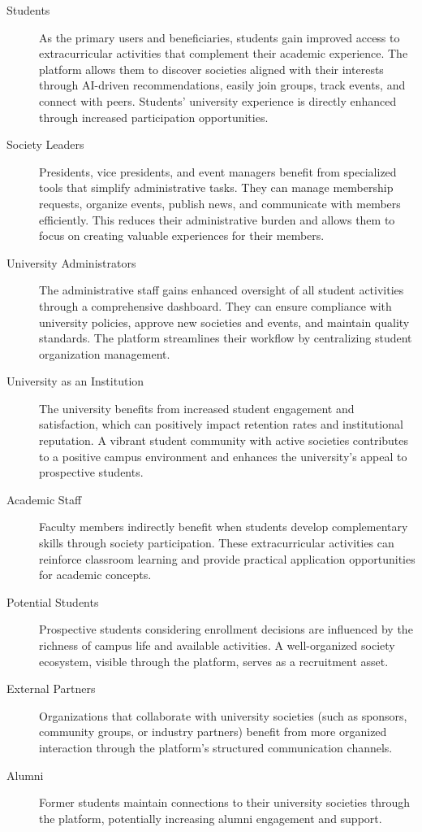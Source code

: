 \begin{description}
    \item[Students] As the primary users and beneficiaries, students gain improved access to extracurricular activities that complement their academic experience. The platform allows them to discover societies aligned with their interests through AI-driven recommendations, easily join groups, track events, and connect with peers. Students' university experience is directly enhanced through increased participation opportunities.
    
    \item[Society Leaders] Presidents, vice presidents, and event managers benefit from specialized tools that simplify administrative tasks. They can manage membership requests, organize events, publish news, and communicate with members efficiently. This reduces their administrative burden and allows them to focus on creating valuable experiences for their members.
    
    \item[University Administrators] The administrative staff gains enhanced oversight of all student activities through a comprehensive dashboard. They can ensure compliance with university policies, approve new societies and events, and maintain quality standards. The platform streamlines their workflow by centralizing student organization management.
    
    \item[University as an Institution] The university benefits from increased student engagement and satisfaction, which can positively impact retention rates and institutional reputation. A vibrant student community with active societies contributes to a positive campus environment and enhances the university's appeal to prospective students.
    
    \item[Academic Staff] Faculty members indirectly benefit when students develop complementary skills through society participation. These extracurricular activities can reinforce classroom learning and provide practical application opportunities for academic concepts.
    
    \item[Potential Students] Prospective students considering enrollment decisions are influenced by the richness of campus life and available activities. A well-organized society ecosystem, visible through the platform, serves as a recruitment asset.
    
    \item[External Partners] Organizations that collaborate with university societies (such as sponsors, community groups, or industry partners) benefit from more organized interaction through the platform's structured communication channels.
    \item[Alumni] Former students maintain connections to their university societies through the platform, potentially increasing alumni engagement and support.
\end{description}


